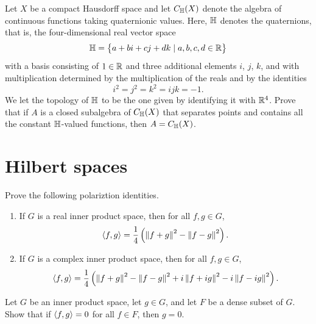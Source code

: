 \documentclass[11pt,a4paper]{article}
\begin{document}
\begin{exercise}[Holladay]
  Let $X$ be a compact Hausdorff space and let $C_{\mathbb{H}}(X)$ denote the
  algebra of continuous functions taking quaternionic values.
  Here, $\mathbb{H}$ denotes the quaternions, that is,
  the four-dimensional real vector space
  \[
    \mathbb{H} = \left\{a + bi + cj + dk \mid a,b,c,d \in \mathbb{R}\right\}
  \]
  with a basis consisting of $1 \in \mathbb{R}$
  and three additional elements $i$, $j$, $k$, and with multiplication
  determined by the multiplication of the reals and by the identities
  \[
    i^2 = j^2 = k^2 = ijk = -1.
  \]
  We let the topology of $\mathbb{H}$ to be the one given by identifying it with $\mathbb{R}^4$.
  Prove that if $A$ is a closed subalgebra of $C_{\mathbb{H}}(X)$
  that separates points and contains all the constant $\mathbb{H}$-valued functions,
  then $A = C_{\mathbb{H}}(X)$.
\end{exercise}
\begin{solution}

\end{solution}

\newpage

\section{Hilbert spaces}

\begin{exercise}
  Prove the following polariztion identities.
  \begin{enumerate}
    \item[(1)] If $G$ is a real inner product space, then for all $f,g \in G$,
      \[
        \ip{f}{g} = \frac{1}{4} \del{\norm{f + g}^2 - \norm{f - g}^2}.
      \]
    \item[(1)] If $G$ is a complex inner product space,
      then for all $f,g \in G$,
      \[
        \ip{f}{g} = \frac{1}{4} \del{\norm{f + g}^2 - \norm{f - g}^2
          + i \norm{f + ig}^2 - i \norm{f - ig}^2}.
      \]
  \end{enumerate}
\end{exercise}
\begin{solution}

\end{solution}

\begin{exercise}
  Let $G$ be an inner product space, let $g \in G$,
  and let $F$ be a dense subset of $G$.
  Show that if $\left\langle f, g \right\rangle = 0$ for all $f \in F$, then $g = 0$.
\end{exercise}
\begin{solution}

\end{solution}
\end{document}
